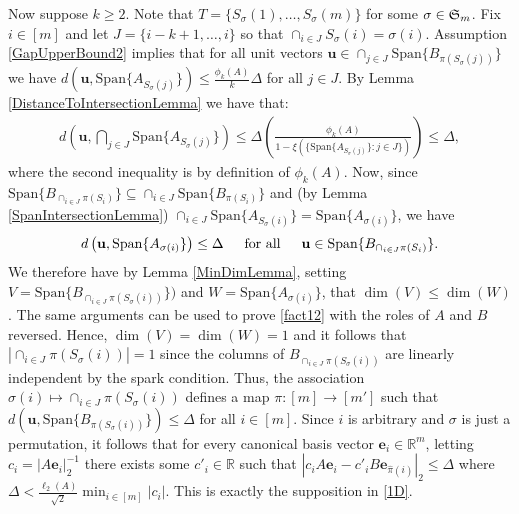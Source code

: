 \documentclass[journal, onecolumn]{IEEEtran}
\begin{document}

Now suppose $k \geq 2$. Note that $T = \{S_\sigma(1), \ldots, S_\sigma(m)\}$ for some $\sigma \in \frak{S}_m$. Fix $i \in [m]$ and let $J = \{i-k+1, \ldots, i\}$ so that $\cap_{i \in J} S_\sigma(i) = \sigma(i)$. Assumption \eqref{GapUpperBound2} implies that for all unit vectors $\mathbf{u} \in \cap_{j \in J} \text{Span}\{B_{\pi(S_\sigma(j))}\}$ we have $d(\mathbf{u}, \text{Span}\{A_{S_\sigma(j)}\}) \leq \frac{\phi_k(A)}{k} \Delta$ for all $j \in J$. By Lemma \ref{DistanceToIntersectionLemma} we have that:
\begin{align}\label{sym2}
d\left( \mathbf{u}, \bigcap_{j \in J} \text{Span}\{A_{S_{\sigma}(j)}\} \right) 
\leq \Delta \left( \frac{\phi_k(A)}{1 - \xi(\{ \text{Span}\{A_{S_{\sigma}(j)}\} : j \in J \})} \right) \leq \Delta,
\end{align}
%
where the second inequality is by definition of $\phi_k(A)$. Now, since $\text{Span}\{B_{\cap_{i \in J}\pi(S_i)}\} \subseteq \cap_{i \in J} \text{Span}\{B_{\pi(S_i)}\}$ and (by Lemma \ref{SpanIntersectionLemma}) $\cap_{i \in J}  \text{Span}\{A_{S_\sigma(i)}\} = \text{Span}\{A_{\sigma(i)}\}$, we have
\begin{align}\label{fact12}
d\left( \mathbf{u}, \text{Span}\{A_{\sigma(i)}\} \right) \leq \Delta \indent \text{for all} \indent \mathbf{u} \in \text{Span}\{B_{\cap_{i \in J}\pi(S_i)}\}.
\end{align}
We therefore have by Lemma \ref{MinDimLemma}, setting $V = \text{Span}\{B_{\cap_{i \in J}\pi(S_\sigma(i))}\})$ and $W = \text{Span}\{A_{\sigma(i)}\}$, that $\dim(V) \leq \dim(W)$. The same arguments can be used to prove \eqref{fact12} with the roles of $A$ and $B$ reversed. Hence, $\dim(V) = \dim(W) = 1$ and it follows that $|\cap_{i \in J} \pi(S_\sigma(i))| = 1$ since the columns of $B_{\cap_{i \in J} \pi(S_\sigma(i))}$ are linearly independent by the spark condition. Thus, the association $\sigma(i) \mapsto \cap_{i \in J} \pi(S_\sigma(i))$ defines a map $\pi: [m] \to [m']$ such that $d\left( \mathbf{u}, \text{Span}\{B_{ \pi(S_\sigma(i))}\}\right) \leq \Delta$ for all $i \in [m]$.
Since $i$ is arbitrary and $\sigma$ is just a permutation, it follows that for every canonical basis vector $\mathbf{e}_i \in \mathbb{R}^m$, letting $c_i = |A\mathbf{e}_i|_2^{-1}$ there exists some $c'_i \in \mathbb{R}$ such that $|c_iA\mathbf{e}_i - c'_iB\mathbf{e}_{\hat \pi(i)}|_2 \leq \Delta$ where $\Delta < \frac{\ell_2(A)}{\sqrt{2}} \min_{i \in [m]} |c_i|$. This is exactly the supposition in \eqref{1D}.
\end{document}
